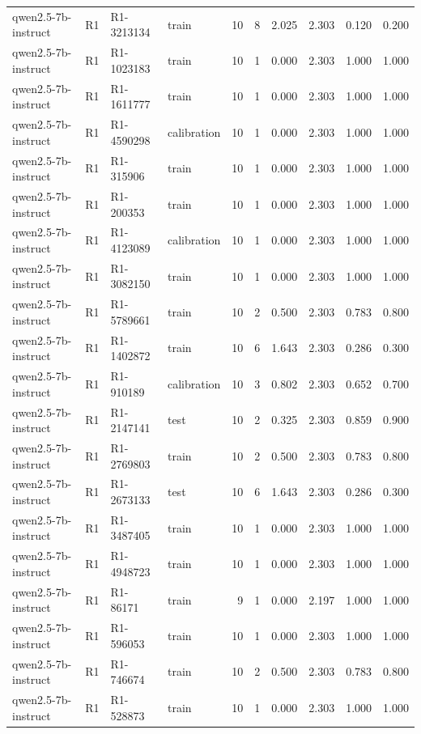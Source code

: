 \begin{table}
\begin{tabular}{llllrrrrrr}
qwen2.5-7b-instruct & R1 & R1-3213134 & train & 10 & 8 & 2.025 & 2.303 & 0.120 & 0.200 \\
qwen2.5-7b-instruct & R1 & R1-1023183 & train & 10 & 1 & 0.000 & 2.303 & 1.000 & 1.000 \\
qwen2.5-7b-instruct & R1 & R1-1611777 & train & 10 & 1 & 0.000 & 2.303 & 1.000 & 1.000 \\
qwen2.5-7b-instruct & R1 & R1-4590298 & calibration & 10 & 1 & 0.000 & 2.303 & 1.000 & 1.000 \\
qwen2.5-7b-instruct & R1 & R1-315906 & train & 10 & 1 & 0.000 & 2.303 & 1.000 & 1.000 \\
qwen2.5-7b-instruct & R1 & R1-200353 & train & 10 & 1 & 0.000 & 2.303 & 1.000 & 1.000 \\
qwen2.5-7b-instruct & R1 & R1-4123089 & calibration & 10 & 1 & 0.000 & 2.303 & 1.000 & 1.000 \\
qwen2.5-7b-instruct & R1 & R1-3082150 & train & 10 & 1 & 0.000 & 2.303 & 1.000 & 1.000 \\
qwen2.5-7b-instruct & R1 & R1-5789661 & train & 10 & 2 & 0.500 & 2.303 & 0.783 & 0.800 \\
qwen2.5-7b-instruct & R1 & R1-1402872 & train & 10 & 6 & 1.643 & 2.303 & 0.286 & 0.300 \\
qwen2.5-7b-instruct & R1 & R1-910189 & calibration & 10 & 3 & 0.802 & 2.303 & 0.652 & 0.700 \\
qwen2.5-7b-instruct & R1 & R1-2147141 & test & 10 & 2 & 0.325 & 2.303 & 0.859 & 0.900 \\
qwen2.5-7b-instruct & R1 & R1-2769803 & train & 10 & 2 & 0.500 & 2.303 & 0.783 & 0.800 \\
qwen2.5-7b-instruct & R1 & R1-2673133 & test & 10 & 6 & 1.643 & 2.303 & 0.286 & 0.300 \\
qwen2.5-7b-instruct & R1 & R1-3487405 & train & 10 & 1 & 0.000 & 2.303 & 1.000 & 1.000 \\
qwen2.5-7b-instruct & R1 & R1-4948723 & train & 10 & 1 & 0.000 & 2.303 & 1.000 & 1.000 \\
qwen2.5-7b-instruct & R1 & R1-86171 & train & 9 & 1 & 0.000 & 2.197 & 1.000 & 1.000 \\
qwen2.5-7b-instruct & R1 & R1-596053 & train & 10 & 1 & 0.000 & 2.303 & 1.000 & 1.000 \\
qwen2.5-7b-instruct & R1 & R1-746674 & train & 10 & 2 & 0.500 & 2.303 & 0.783 & 0.800 \\
qwen2.5-7b-instruct & R1 & R1-528873 & train & 10 & 1 & 0.000 & 2.303 & 1.000 & 1.000 \\

\end{tabular}
\end{table}
